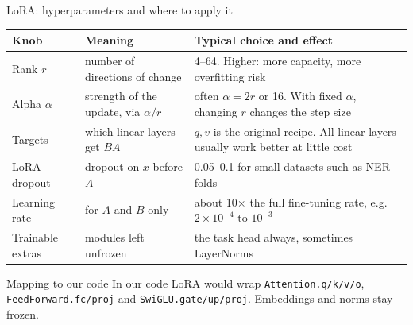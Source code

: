 \documentclass[aspectratio=169,11pt]{beamer}
\newcommand{\code}[1]{\texttt{\small #1}}
\begin{document}
\begin{frame}{LoRA: hyperparameters and where to apply it}
  \footnotesize
  \begin{tabularx}{\textwidth}{@{}l X X@{}}
    \toprule
    Knob & Meaning & Typical choice and effect\\
    \midrule
    Rank $r$ & number of directions of change & 4--64. Higher: more capacity, more overfitting risk\\
    Alpha $\alpha$ & strength of the update, via $\alpha/r$ & often $\alpha=2r$ or 16. With fixed $\alpha$, changing $r$ changes the step size\\
    Targets & which linear layers get $BA$ & $q,v$ is the original recipe. All linear layers usually work better at little cost\\
    LoRA dropout & dropout on $x$ before $A$ & 0.05--0.1 for small datasets such as NER folds\\
    Learning rate & for $A$ and $B$ only & about 10$\times$ the full fine-tuning rate, e.g.\ $2\times10^{-4}$ to $10^{-3}$\\
    Trainable extras & modules left unfrozen & the task head always, sometimes LayerNorms\\
    \bottomrule
  \end{tabularx}
  \vspace{2mm}
  \begin{exampleblock}{Mapping to our code}
    \small
    In our code LoRA would wrap \code{Attention.q/k/v/o}, \code{FeedForward.fc/proj} and \code{SwiGLU.gate/up/proj}. Embeddings and norms stay frozen.
  \end{exampleblock}
\end{frame}
\end{document}

